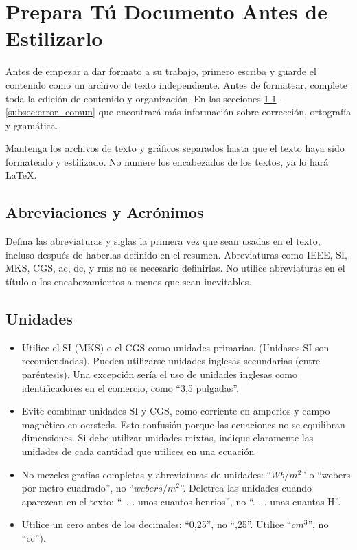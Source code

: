 \section{Prepara Tú Documento Antes de Estilizarlo} \label{sec:prep_docum}

Antes de empezar a dar formato a su trabajo, primero escriba y guarde el contenido como un archivo de texto independiente. Antes de formatear, complete toda la edición de contenido y organización. En las secciones \ref{subsec:abrev_acron}--\ref{subsec:error_comun} que encontrará más información sobre corrección, ortografía y gramática. \par

Mantenga los archivos de texto y gráficos separados hasta que el texto haya sido formateado y estilizado. No numere los encabezados de los textos, ya lo hará {\LaTeX}.

\subsection{Abreviaciones y Acrónimos} \label{subsec:abrev_acron}

Defina las abreviaturas y siglas la primera vez que sean usadas en el texto, incluso después de haberlas definido en el resumen. Abreviaturas como IEEE, SI, MKS, CGS, ac, dc, y rms no es necesario definirlas. No utilice abreviaturas en el título o los encabezamientos a menos que sean inevitables.


\subsection{Unidades} \label{subsec:unid}

\begin{itemize}
    \item Utilice el SI (MKS) o el CGS como unidades primarias. (Unidases SI son recomiendadas). Pueden utilizarse unidades inglesas secundarias (entre paréntesis). Una excepción sería el uso de unidades inglesas como identificadores en el comercio, como ``3,5 pulgadas''.
    \item Evite combinar unidades SI y CGS, como corriente en amperios y campo magnético en oersteds. Esto confusión porque las ecuaciones no se equilibran dimensiones. Si debe utilizar unidades mixtas, indique claramente las unidades de cada cantidad que utilices en una ecuación
    \item No mezcles grafías completas y abreviaturas de unidades: ``$Wb/{m}^2$'' o ``webers por metro cuadrado'', no ``$webers/{m}^2$''. Deletrea las unidades cuando aparezcan en el texto: ``. . . unos cuantos henrios'', no ``. . . unas cuantas H''.
    \item Utilice un cero antes de los decimales: ``0,25'', no ``,25''. Utilice ``$cm^3$'', no ``cc'').
\end{itemize}

